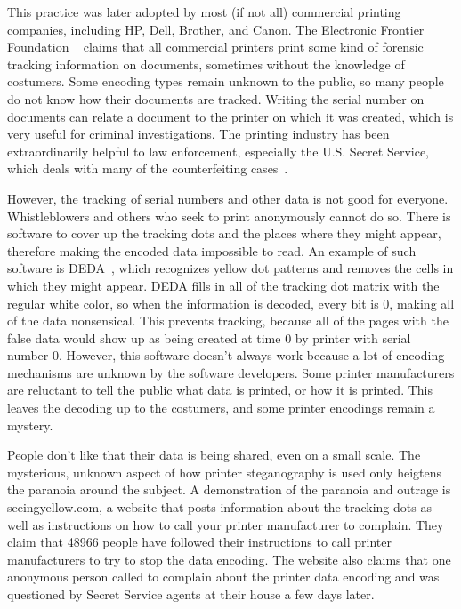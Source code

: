 	This practice was later adopted by most (if not all) commercial printing companies, including HP, Dell, Brother, and Canon. The Electronic Frontier Foundation ~\cite{EFF} claims that all commercial printers print some kind of forensic tracking information on documents, sometimes without the knowledge of costumers. Some encoding types remain unknown to the public, so many people do not know how their documents are tracked. Writing the serial number on documents can relate a document to the printer on which it was created, which is very useful for criminal investigations. The printing industry has been extraordinarily helpful to law enforcement, especially the U.S. Secret Service, which deals with many of the counterfeiting cases~\cite{pcworld}. 

	However, the tracking of serial numbers and other data is not good for everyone. Whistleblowers and others who seek to print anonymously cannot do so. There is software to cover up the tracking dots and the places where they might appear, therefore making the encoded data impossible to read. An example of such software is DEDA~\cite{deda}, which recognizes yellow dot patterns and removes the cells in which they might appear. DEDA fills in all of the tracking dot matrix with the regular white color, so when the information is decoded, every bit is 0, making all of the data nonsensical. This prevents tracking, because all of the pages with the false data would show up as being created at time 0 by printer with serial number 0. However, this software doesn't always work because a lot of encoding mechanisms are unknown by the software developers. Some printer manufacturers are reluctant to tell the public what data is printed, or how it is printed. This leaves the decoding up to the costumers, and some printer encodings remain a mystery.

	People don't like that their data is being shared, even on a small scale. The mysterious, unknown aspect of how printer steganography is used only heigtens the paranoia around the subject. A demonstration of the paranoia and outrage is seeingyellow.com, a website that posts information about the tracking dots as well as instructions on how to call your printer manufacturer to complain. They claim that 48966 people have followed their instructions to call printer manufacturers to try to stop the data encoding. The website also claims that one anonymous person called to complain about the printer data encoding and was questioned by Secret Service agents at their house a few days later.

